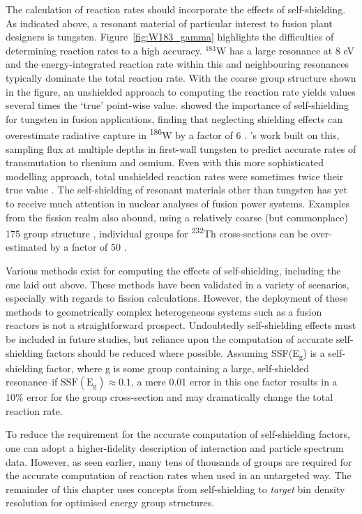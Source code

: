The calculation of reaction rates should incorporate the effects of self-shielding. As indicated above, a resonant material of particular interest to fusion plant designers is tungsten. Figure~\ref{fig:W183_gamma} highlights the difficulties of determining reaction rates to a high accuracy. $^{183}$W has a large resonance at 8 eV and the energy-integrated reaction rate within this and neighbouring resonances typically dominate the total reaction rate. With the coarse group structure shown in the figure, an unshielded approach to computing the reaction rate yields values several times the `true' point-wise value. \citeauthor{Pampin2005} showed the importance of self-shielding for tungsten in fusion applications, finding that neglecting shielding effects can overestimate radiative capture in \textsuperscript{186}W by a factor of 6 \cite{Pampin2005}. \citeauthor{Gilbert2016}'s work built on this, sampling flux at multiple depths in first-wall tungsten to predict accurate rates of transmutation to rhenium and osmium. Even with this more sophisticated modelling approach, total unshielded reaction rates were sometimes twice their true value \cite{Gilbert2016}. The self-shielding of resonant materials other than tungsten has yet to receive much attention in nuclear analyses of fusion power systems. Examples from the fission realm also abound, using a relatively coarse (but commonplace) 175 group structure \cite{Plechaty1978}, individual groups for \textsuperscript{232}Th cross-sections can be over-estimated by a factor of 50 \cite{Cacuci2010}. 

Various methods exist for computing the effects of self-shielding, including the one laid out above. These methods have been validated in a variety of scenarios, especially with regards to fission calculations. However, the deployment of these methods to geometrically complex heterogeneous systems such as a fusion reactors is not a straightforward prospect. Undoubtedly self-shielding effects must be included in future studies, but reliance upon the computation of accurate self-shielding factors should be reduced where possible. Assuming SSF(E\textsubscript{g}) is a self-shielding factor, where g is some group containing a large, self-shielded resonance--if $\mathrm{SSF(E_{g})} \approx 0.1$, a mere 0.01 error in this one factor results in a 10\% error for the group cross-section and may dramatically change the total reaction rate. 

To reduce the requirement for the accurate computation of self-shielding factors, one can adopt a higher-fidelity description of interaction and particle spectrum data. However, as seen earlier, many tens of thousands of groups are required for the accurate computation of reaction rates when used in an untargeted way. The remainder of this chapter uses concepts from self-shielding to \textit{target} bin density resolution for optimised energy group structures. 

